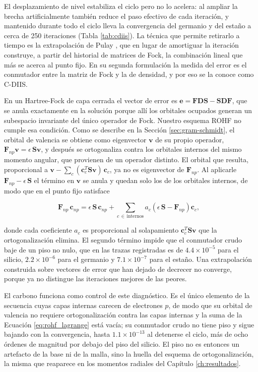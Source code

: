 El desplazamiento de nivel estabiliza el ciclo pero no lo acelera: al ampliar la brecha artificialmente también reduce el paso efectivo de cada iteración, y mantenido durante todo el ciclo lleva la convergencia del germanio y del estaño a cerca de 250 iteraciones (Tabla \ref{tab:cdiis}). La técnica que permite retirarlo a tiempo es la extrapolación de Pulay \parencite{Pulay1980}, que en lugar de amortiguar la iteración construye, a partir del historial de matrices de Fock, la combinación lineal que más se acerca al punto fijo. En su segunda formulación \parencite{Pulay1982} la medida del error es el conmutador entre la matriz de Fock y la de densidad, y por eso se la conoce como C-DIIS.

En un Hartree-Fock de capa cerrada el vector de error es $\bm{e} = \bm{F}\bm{D}\bm{S} - \bm{S}\bm{D}\bm{F}$, que se anula exactamente en la solución porque allí los orbitales ocupados generan un subespacio invariante del único operador de Fock. Nuestro esquema ROHF no cumple esa condición. Como se describe en la Sección \ref{sec:gram-schmidt}, el orbital de valencia se obtiene como eigenvector $\bm{v}$ de su propio operador, $\bm{F}_{np}\bm{v} = \epsilon\,\bm{S}\bm{v}$, y después se ortogonaliza contra los orbitales internos del mismo momento angular, que provienen de un operador distinto. El orbital que resulta, proporcional a $\bm{v} - \sum_c (\bm{c}_c^{T}\bm{S}\bm{v})\,\bm{c}_c$, ya no es eigenvector de $\bm{F}_{np}$. Al aplicarle $\bm{F}_{np} - \epsilon\,\bm{S}$ el término en $\bm{v}$ se anula y quedan solo los de los orbitales internos, de modo que en el punto fijo satisface

\begin{equation}
    \label{eq:rohf_lagrange}
    \bm{F}_{np}\,\bm{c}_{np} = \epsilon\,\bm{S}\,\bm{c}_{np} + \sum_{c \,\in\, \text{internos}} a_c \left( \epsilon\,\bm{S} - \bm{F}_{np} \right) \bm{c}_{c},
\end{equation}

donde cada coeficiente $a_c$ es proporcional al solapamiento $\bm{c}_c^{T}\bm{S}\bm{v}$ que la ortogonalización elimina. El segundo término impide que el conmutador crudo baje de un piso no nulo, que en las trazas registradas es de $4.4\times10^{-5}$ para el silicio, $2.2\times10^{-6}$ para el germanio y $7.1\times10^{-7}$ para el estaño. Una extrapolación construida sobre vectores de error que han dejado de decrecer no converge, porque ya no distingue las iteraciones mejores de las peores.

El carbono funciona como control de este diagnóstico. Es el único elemento de la secuencia cuyas capas internas carecen de electrones $p$, de modo que su orbital de valencia no requiere ortogonalización contra las capas internas y la suma de la Ecuación \eqref{eq:rohf_lagrange} está vacía; su conmutador crudo no tiene piso y sigue bajando con la convergencia, hasta $1.1\times10^{-13}$ al detenerse el ciclo, más de ocho órdenes de magnitud por debajo del piso del silicio. El piso no es entonces un artefacto de la base ni de la malla, sino la huella del esquema de ortogonalización, la misma que reaparece en los momentos radiales del Capítulo \ref{ch:resultados}.

